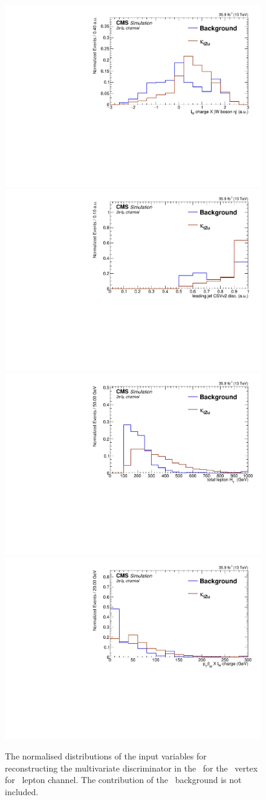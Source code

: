 \begin{figure}[htbp]
	\includegraphics[width=0.3\linewidth]{6_Search/Figures/BDTinputvars/Zut/singletop_MVA_charge_asym_eeu_Normalized}
	\includegraphics[width=0.3\linewidth]{6_Search/Figures/BDTinputvars/Zut/singletop_MVA_bdiscCSVv2_jet_0_eeu_Normalized}
	\includegraphics[width=0.3\linewidth]{6_Search/Figures/BDTinputvars/Zut/singletop_MVA_TotalHt_lep_eeu_Normalized}
	\includegraphics[width=0.3\linewidth]{6_Search/Figures/BDTinputvars/Zut/singletop_MVA_ptWQ_eeu_Normalized}
	\caption{The normalised distributions of the input variables for reconstructing the multivariate discriminator in the \STSR\ for the \Zut\ vertex for \eemu\ lepton channel. The contribution of the \NPL\ background is not included. }
	\label{fig:singletopZutnormalizedeeu}
\end{figure}
